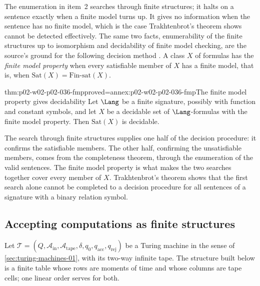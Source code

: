 The enumeration in item~2 searches through finite structures; it halts on a
sentence exactly when a finite model turns up.  It gives no information when
the sentence has no finite model, which is the case Trakhtenbrot's theorem
shows cannot be detected effectively.  The same two facts, enumerability of
the finite structures up to isomorphism and decidability of finite model
checking, are the source's ground for the following decision method
\cite[Sect.~2.1.2, p.~33]{BorgerGradelGurevich1997}.  A class \(X\) of
formulas has the \emph{finite model property} when every satisfiable member of
\(X\) has a finite model, that is, when \(\mathrm{Sat}(X)=
\mathrm{Fin\text{-}sat}(X)\).

\begin{hbtheorem}{thm:p02-w02-p02-036-fmp}{proved=annex:p02-w02-p02-036-fmp}{The finite model property gives decidability}
Let \(\Lang\) be a finite signature, possibly with function and constant
symbols, and let \(X\) be a decidable set of \(\Lang\)-formulas with the
finite model property.  Then \(\mathrm{Sat}(X)\) is decidable.
\end{hbtheorem}

The search through finite structures supplies one half of the decision
procedure: it confirms the satisfiable members.  The other half, confirming
the unsatisfiable members, comes from the completeness theorem, through the
enumeration of the valid sentences.  The finite model property is what makes
the two searches together cover every member of \(X\).  Trakhtenbrot's theorem
shows that the first search alone cannot be completed to a decision procedure
for all sentences of a signature with a binary relation symbol.

\subsection{Accepting computations as finite structures}
\label{sec:p02-w02-p02-036-run-sentence}

Let \(\mathcal T=(Q,\mathcal A_{\mathrm{in}},\mathcal A_{\mathrm{tape}},
\delta,q_0,q_{\mathrm{acc}},q_{\mathrm{rej}})\) be a Turing machine in the
sense of \cref{sec:turing-machines-01}, with its two-way infinite tape.  The
structure built below is a finite table whose rows are moments of time and whose
columns are tape cells; one linear order serves for both.

